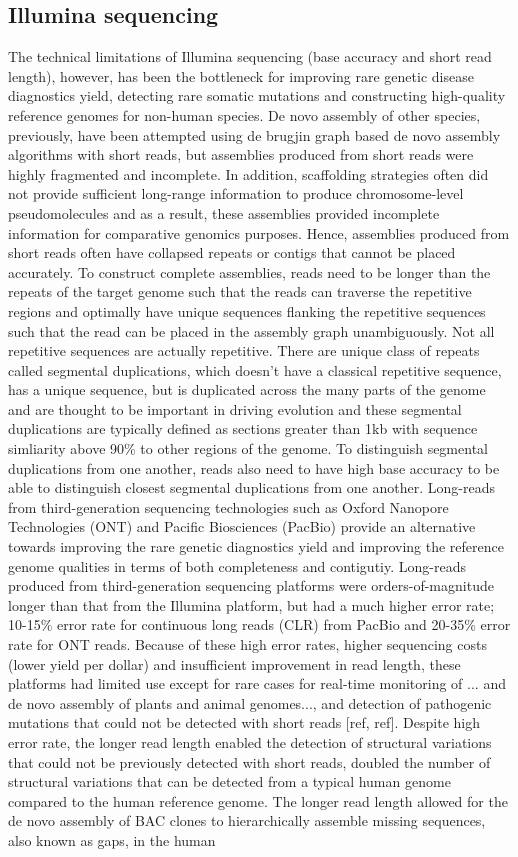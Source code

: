 \subsection{Illumina sequencing}
The technical limitations of Illumina sequencing (base accuracy and short read length), however, has been the bottleneck for improving rare genetic disease diagnostics yield, detecting rare somatic mutations and constructing high-quality reference genomes for non-human species. De novo assembly of other species, previously, have been attempted using de brugjin graph based de novo assembly algorithms with short reads, but assemblies produced from short reads were highly fragmented and incomplete. In addition, scaffolding strategies often did not provide sufficient long-range information to produce chromosome-level pseudomolecules and as a result, these assemblies provided incomplete information for comparative genomics purposes. Hence, assemblies produced from short reads often have collapsed repeats or contigs that cannot be placed accurately. To construct complete assemblies, reads need to be longer than the repeats of the target genome such that the reads can traverse the repetitive regions and optimally have unique sequences flanking the repetitive sequences such that the read can be placed in the assembly graph unambiguously. Not all repetitive sequences are actually repetitive. There are unique class of repeats called segmental duplications, which doesn't have a classical repetitive sequence, has a unique sequence, but is duplicated across the many parts of the genome and are thought to be important in driving evolution and these segmental duplications are typically defined as sections greater than 1kb with sequence simliarity above 90\% to other regions of the genome. To distinguish segmental duplications from one another, reads also need to have high base accuracy to be able to distinguish closest segmental duplications from one another. Long-reads from third-generation sequencing technologies such as Oxford Nanopore Technologies (ONT) and Pacific Biosciences (PacBio) provide an alternative towards improving the rare genetic diagnostics yield and improving the reference genome qualities in terms of both completeness and contigutiy. Long-reads produced from third-generation sequencing platforms were orders-of-magnitude longer than that from the Illumina platform, but had a much higher error rate; 10-15\% error rate for continuous long reads (CLR) from PacBio and 20-35\% error rate for ONT reads. Because of these high error rates, higher sequencing costs (lower yield per dollar) and insufficient improvement in read length, these platforms had limited use except for rare cases for real-time monitoring of ... and de novo assembly of plants and animal genomes..., and detection of pathogenic mutations that could not be detected with short reads [ref, ref]. Despite high error rate, the longer read length enabled the detection of structural variations that could not be previously detected with short reads, doubled the number of structural variations that can be detected from a typical human genome compared to the human reference genome. The longer read length allowed for the de novo assembly of BAC clones to hierarchically assemble missing sequences, also known as gaps, in the human 